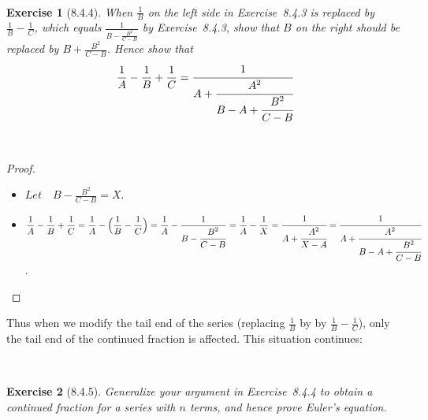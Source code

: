 \documentclass[12pt]{article}
\newcommand{\XB}{\color{black}}
\newcommand{\XBB}{\color{blue}}
\newcommand{\ds}{\displaystyle}
\theoremstyle{plain}
\newtheorem{ex}{Exercise}
\begin{document}
\XBB\hrulefill\XB \\
\begin{ex} [8.4.4]
  When $ \frac{1}{B} $ on the left side in Exercise~8.4.3 is replaced by $ \frac{1}{B} - \frac{1}{C} $,
  which equals $ \frac{1}{B - \frac{B^{2}}{C - B}} $ by Exercise~8.4.3, show that $ B $ on the right should be replaced by $ B + \frac{B^{2}}{C - B} $. Hence show that
  \[
    \frac{1}{A} - \frac{1}{B} + \frac{1}{C} = \cfrac{1}{A + \cfrac{A^{2}}{B - A + \cfrac{B^{2}}{C - B}}}
  \]
\end{ex}
\XBB\hrulefill\XB \\

\begin{proof}
  \ \\

  \begin{itemize}
    \item $ \ds Let \quad B - \frac{B^{2}}{C - B} = X $.
    \item $ \ds \frac{1}{A} - \frac{1}{B} + \frac{1}{C} = \frac{1}{A} - \Bigl( \frac{1}{B} - \frac{1}{C} \Bigr) = \frac{1}{A} - \frac{1}{B - \cfrac{B^{2}}{C - B}} = \frac{1}{A} - \frac{1}{X} = \cfrac{1}{A + \cfrac{A^{2}}{X - A}} = \cfrac{1}{A + \cfrac{A^{2}}{B - A + \cfrac{B^{2}}{C - B}}} $.
  \end{itemize}

\end{proof}

\newpage

Thus when we modify the tail end of the series (replacing $ \frac{1}{B} $ by by $ \frac{1}{B} - \frac{1}{C} $), only the tail end of the continued fraction is affected. This situation continues:


\XBB\hrulefill\XB \\
\begin{ex} [8.4.5]
  Generalize your argument in Exercise~8.4.4 to obtain a continued fraction for a series with $n$ terms, and hence prove Euler's equation.
\end{ex}
\XBB\hrulefill\XB \\
\end{document}
